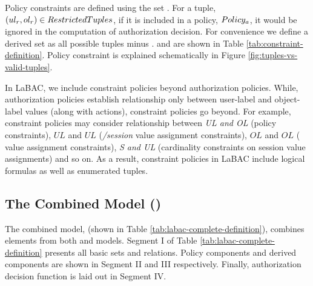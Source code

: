 	


	Policy constraints are defined using the set \textit{\restrictedTuples}.  For a tuple, $(ul_r,ol_r) \in RestrictedTuples$, if it is included in a policy, $Policy_a$, it would be ignored in the computation of authorization decision. For convenience we define a derived set \textit{\policyBound} as all possible tuples minus \textit{\restrictedTuples}. \textit{\restrictedTuples} and \textit{\policyBound} are shown in Table \ref{tab:constraint-definition}. Policy constraint is explained schematically in Figure \ref{fig:tuples-vs-valid-tuples}.
	
	In LaBAC, we include constraint policies beyond authorization policies. While, authorization policies establish relationship only between user-label and object-label values (along with actions), constraint policies go beyond. For example, constraint policies may consider relationship between \textit{UL and OL} (policy constraints), $UL$ and $UL$ (\textit{\uLabel/session} value assignment constraints), $OL$ and $OL$ (\textit{\oLabel} value assignment constraints), \textit{S and UL} (cardinality constraints on session value assignments) and so on.  As a result, constraint policies in LaBAC include logical formulas as well as enumerated tuples.
	
	
	
	
	\subsection{The Combined Model (\labacOneOneOne{})}
	
	The combined model, \labacOneOneOne{} (shown in Table \ref{tab:labac-complete-definition}), combines elements from both \hlabac{} and \consLabac{} models.  Segment I of Table \ref{tab:labac-complete-definition} presents all basic sets and relations. Policy components and derived components are shown in Segment II and  III respectively. Finally, authorization decision function is laid out in Segment IV.
	

